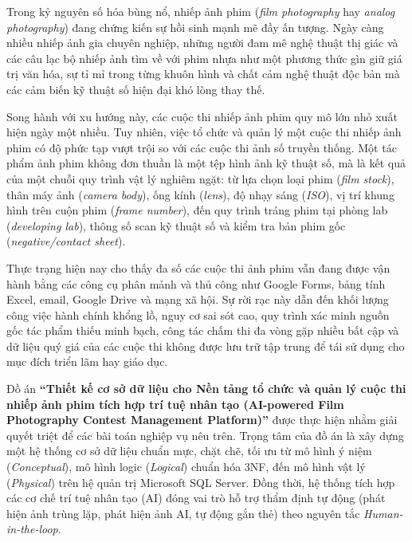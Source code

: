 
Trong kỷ nguyên số hóa bùng nổ, nhiếp ảnh phim (\textit{film photography} hay \textit{analog photography}) đang chứng kiến sự hồi sinh mạnh mẽ đầy ấn tượng. Ngày càng nhiều nhiếp ảnh gia chuyên nghiệp, những người đam mê nghệ thuật thị giác và các câu lạc bộ nhiếp ảnh tìm về với phim nhựa như một phương thức gìn giữ giá trị văn hóa, sự tỉ mỉ trong từng khuôn hình và chất cảm nghệ thuật độc bản mà các cảm biến kỹ thuật số hiện đại khó lòng thay thế.

Song hành với xu hướng này, các cuộc thi nhiếp ảnh phim quy mô lớn nhỏ xuất hiện ngày một nhiều. Tuy nhiên, việc tổ chức và quản lý một cuộc thi nhiếp ảnh phim có độ phức tạp vượt trội so với các cuộc thi ảnh số truyền thống. Một tác phẩm ảnh phim không đơn thuần là một tệp hình ảnh kỹ thuật số, mà là kết quả của một chuỗi quy trình vật lý nghiêm ngặt: từ lựa chọn loại phim (\textit{film stock}), thân máy ảnh (\textit{camera body}), ống kính (\textit{lens}), độ nhạy sáng (\textit{ISO}), vị trí khung hình trên cuộn phim (\textit{frame number}), đến quy trình tráng phim tại phòng lab (\textit{developing lab}), thông số scan kỹ thuật số và kiểm tra bản phim gốc (\textit{negative/contact sheet}).

Thực trạng hiện nay cho thấy đa số các cuộc thi ảnh phim vẫn đang được vận hành bằng các công cụ phân mảnh và thủ công như Google Forms, bảng tính Excel, email, Google Drive và mạng xã hội. Sự rời rạc này dẫn đến khối lượng công việc hành chính khổng lồ, nguy cơ sai sót cao, quy trình xác minh nguồn gốc tác phẩm thiếu minh bạch, công tác chấm thi đa vòng gặp nhiều bất cập và dữ liệu quý giá của các cuộc thi không được lưu trữ tập trung để tái sử dụng cho mục đích triển lãm hay giáo dục.

Đồ án \textbf{``Thiết kế cơ sở dữ liệu cho Nền tảng tổ chức và quản lý cuộc thi nhiếp ảnh phim tích hợp trí tuệ nhân tạo (AI-powered Film Photography Contest Management Platform)''} được thực hiện nhằm giải quyết triệt để các bài toán nghiệp vụ nêu trên. Trọng tâm của đồ án là xây dựng một hệ thống cơ sở dữ liệu chuẩn mực, chặt chẽ, tối ưu từ mô hình ý niệm (\textit{Conceptual}), mô hình logic (\textit{Logical}) chuẩn hóa 3NF, đến mô hình vật lý (\textit{Physical}) trên hệ quản trị Microsoft SQL Server. Đồng thời, hệ thống tích hợp các cơ chế trí tuệ nhân tạo (AI) đóng vai trò hỗ trợ thẩm định tự động (phát hiện ảnh trùng lặp, phát hiện ảnh AI, tự động gắn thẻ) theo nguyên tắc \textit{Human-in-the-loop}.

